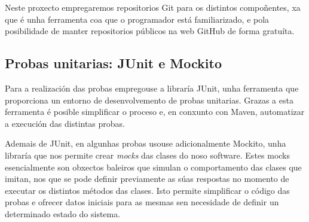 Neste proxecto empregaremos repositorios Git para os distintos compoñentes, xa
que é unha ferramenta coa que o programador está familiarizado, e pola
posibilidade de manter repositorios públicos na web GitHub de forma gratuíta.

\subsection{Probas unitarias: JUnit e Mockito}
\label{subsec:junit}
Para a realización das probas empregouse a libraría JUnit\cite{junit}, unha
ferramenta que proporciona un entorno de desenvolvemento de probas unitarias.
Grazas a esta ferramenta é posible simplificar o proceso e, en conxunto con
Maven, automatizar a execución das distintas probas.

Ademais de JUnit, en algunhas probas usouse adicionalmente
Mockito\cite{mockitoweb}\cite{mockito}, unha libraría que nos permite crear
\textit{mocks} das clases do noso software. Estes mocks esencialmente son
obxectos baleiros que simulan o comportamento das clases que imitan, nos que se
pode definir previamente as súas respostas no momento de executar os distintos
métodos das clases. Isto permite simplificar o código das probas e ofrecer datos
iniciais para as mesmas sen necesidade de definir un determinado estado do
sistema.
